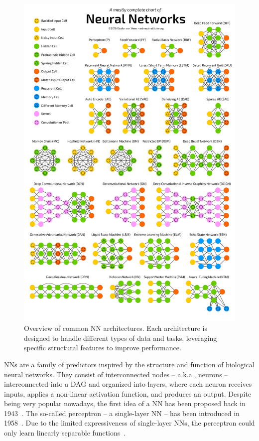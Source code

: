 \subsubsection[Neural networks]{}\label{subsubsec:neural-networks}
%
\begin{figure}
    \centering
    \includegraphics[height=0.9\textheight]
    {figures/neural-network-architectures}
    \caption[Common neural network architectures]{
        Overview of common \gls{NN} architectures.
        Each architecture is designed to handle different types of data and tasks, leveraging specific structural features to improve performance.
    }
    \label{fig:nn-architectures}
\end{figure}
%
\Glspl{NN} are a family of predictors inspired by the structure and function of biological neural networks.
%
They consist of interconnected nodes -- a.k.a., neurons -- interconnected into a \gls{DAG} and organized into layers, where each neuron receives inputs, applies a non-linear activation function, and produces an output.
%
Despite being very popular nowadays, the first idea of a \gls{NN} has been proposed back in 1943~\cite{mcculloch1943logical}.
%
The so-called perceptron -- a single-layer \gls{NN} -- has been introduced in 1958~\cite{rosenblatt1958perceptron}.
%
Due to the limited expressiveness of single-layer \glspl{NN}, the perceptron could only learn linearly separable functions~\cite{DBLP:books/daglib/0066902}.

